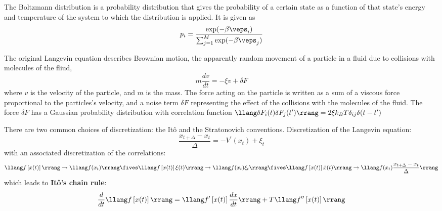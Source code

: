 

 The Boltzmann distribution is a probability distribution that gives the probability of a certain state as a function of that state's energy and temperature of the system to which the distribution is applied. It is given as
$$ p_i = \frac{\exp(-\beta \veps_i)}{\sum_{j=1}^M \exp(-\beta \veps_j)} $$


The original Langevin equation describes Brownian motion, the apparently random movement of a particle in a fluid due to collisions with molecules of the fliud, 
$$ m \frac{dv}{dt} = - \xi v + \delta F $$
where $v$ is the velocity of the particle, and $m$ is the mass. The force acting on the particle is written as a sum of a viscous force proportional to the particles's velocity, and a noise term $\delta F$ representing the effect of the collisions with the molecules of the fluid. The force $\delta F$ has a Gaussian probability distribution with correlation function $ \llang \delta F_i(t) \delta F_j(t^\prime) \rrang = 2 \xi k_B T \delta_{ij} \delta(t-t^\prime)$

There are two common choices of discretization: the Itô and the Stratonovich conventions. Discretization of the Langevin equation:
$$ \frac{x_{t+\Delta} - x_t}{\Delta} = -V^\prime(x_t) + \xi_t $$
with an associated discretization of the correlations:
$$ \llang f\left[x(t)\right] \rrang \to \llang f(x_t) \rrang \fives \llang f\left[x(t)\right] \xi(t) \rrang \to \llang f(x_t)\xi_t \rrang \fives \llang f\left[x(t)\right] \dot{x}(t) \rrang \to \llang f(x_t) \frac{x_{t+\Delta} - x_t}{\Delta} \rrang $$
which leads to \textbf{Itô's chain rule}:
$$ \frac{d}{dt} \llang f\left[x(t)\right] \rrang = \llang f^\prime\left[x(t)\right] \frac{dx}{dt} \rrang + T \llang f^{\prime\prime} \left[ x(t) \right] \rrang $$



